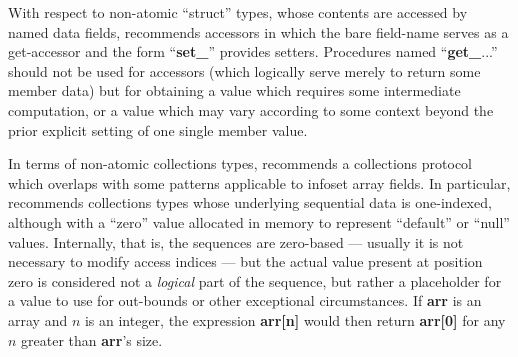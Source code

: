 \documentclass[12pt,letterpaper]{article}
\newcommand{\HGDM}{\resizebox{!}{7.5pt}{\ATexttclr{HGDM}}}
\newcommand{\ATexttclr}[1]{\textcolor{tcolor}{\textbf{#1}}}
\newcommand{\p}[1]{

\vspace{.7em}#1}
\newcommand{\q}[1]{{\fontfamily{qcr}\selectfont ``}#1{\fontfamily{qcr}\selectfont ''}}
\begin{document}
{\p{With respect to non-atomic \q{struct} types, whose contents 
are accessed by named data fields, \HGDM{} recommends 
accessors in which the bare field-name serves as a 
get-accessor and the form \q{\textbf{set\_}} provides 
setters.  Procedures named \q{\textbf{get\_}...} should not be used 
for accessors (which logically serve merely to return some 
member data) but for obtaining a value which requires some 
intermediate computation, or a value which may vary 
according to some context beyond the prior explicit setting of one 
single member value.}  

\p{In terms of non-atomic collections types, \HGDM{} recommends a 
collections protocol which overlaps with some patterns 
applicable to infoset array fields.  In particular, 
\HGDM{} recommends collections types whose underlying 
sequential data is one-indexed, although with a 
\q{zero} value allocated in memory to represent \q{default} 
or \q{null} values.  Internally, that is, the sequences 
are zero-based --- usually it is not necessary to 
modify access indices --- but the actual value present 
at position zero is considered not a \textit{logical} 
part of the sequence, but rather a placeholder for a 
value to use for out-bounds or other exceptional 
circumstances.  If \textbf{arr} is an array and 
$n$ is an integer, the expression \textbf{arr[n]} 
would then return \textbf{arr[0]} for any $n$ greater 
than \textbf{arr}'s size.}

}
\end{document}
